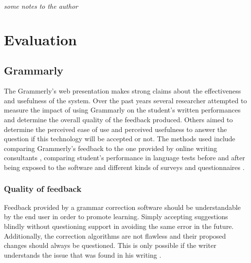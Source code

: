 \documentclass[runningheads]{llncs}
\begin{document}
\vspace*{6mm}\hspace*{6mm} \textit{some notes to the author}  \par

\section{Evaluation}

\subsection{Grammarly}
The Grammerly's web presentation \citep{noauthor_write_nodate} makes strong claims about the effectiveness and usefulness of the system. Over the past years several researcher attempted to measure the impact of using Grammarly on the student's written performances and determine the overall quality of the feedback produced. Others \citep{cavaleri_you_2016} aimed to determine the perceived ease of use and perceived usefulness to answer the question if this technology will be accepted or not. The methods used include comparing Grammerly's feedback to the one provided by online writing consultants \citep{dembsey_closing_2017}, comparing student's performance in language tests before and after being exposed to the software \citep{qassemzadeh_impact_2016} and different kinds of surveys and questionnaires \citep{nova_utilizing_2018} \citep{cavaleri_you_2016} \citep{ventayen_graduate_2018}.

\subsubsection{Quality of feedback}
Feedback provided by a grammar correction software should be understandable by the end user in order to promote learning. Simply accepting suggestions blindly without questioning support in avoiding the same error in the future. Additionally, the correction algorithms are not flawless and their proposed changes should always be questioned. This is only possible if the writer understands the issue that was found in his writing \citep{dembsey_closing_2017}.
\end{document}

